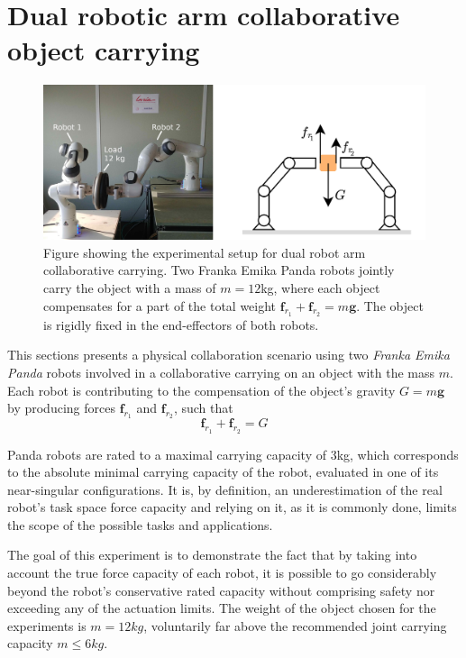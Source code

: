\section{Dual robotic arm collaborative object carrying}
\label{ch:robot_robot_carrying}

\begin{figure}[!h]
    \centering
    \includegraphics[width=\linewidth]{Papers/images/real_robots_schema_exp1.jpg}
    \caption{Figure showing the experimental setup for dual robot arm collaborative carrying. Two Franka Emika Panda robots jointly carry the object with a mass of $m=12$kg, where each object compensates for a part of the total weight $\bm{f}_{r_1} + \bm{f}_{r_2} = m\bm{g}$. The object is rigidly fixed in the end-effectors of both robots.}
    \label{fig:exp1_real_schema}
\end{figure}


This sections presents a physical collaboration scenario using two \textit{Franka Emika Panda} robots involved in a collaborative carrying on an object with the mass $m$. Each robot is contributing to the compensation of the object's gravity $G=m\bm{g}$ by producing forces $\bm{f}_{r_1}$ and $\bm{f}_{r_2}$, such that
\begin{equation}
    \bm{f}_{r_1} + \bm{f}_{r_2} = G
\end{equation}

Panda robots are rated to a maximal carrying capacity of 3kg, which corresponds to the absolute minimal carrying capacity of the robot, evaluated in one of its near-singular configurations. It is, by definition, an underestimation of the real robot's task space force capacity and relying on it, as it is commonly done, limits the scope of the possible tasks and applications.

The goal of this experiment is to demonstrate the fact that by taking into account the true force capacity of each robot, it is possible to go considerably beyond the robot's conservative rated capacity without comprising safety nor exceeding any of the actuation limits. The weight of the object chosen for the experiments is $m=12kg$, voluntarily far above the recommended joint carrying capacity $ m\le 6kg$. 

